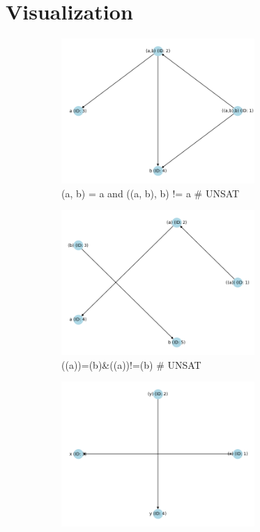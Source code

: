 \documentclass[11pt]{report}
\begin{document}
\newpage
\section*{Visualization}

\begin{figure}[h]

    \begin{subfigure}{0.5\textwidth}
        \includegraphics[width=0.9\linewidth, height=5.5cm]{graph/(a, b) = a and ((a, b), b) != a.png} 
        \caption*{(a, b) = a and ((a, b), b) != a \color{red}\# UNSAT }
        \label{fig:subim1}
        \end{subfigure}
    \begin{subfigure}{0.5\textwidth}
        \includegraphics[width=0.9\linewidth, height=5.5cm]{graph/((a))=(b)&((a))!=(b).png} 
        \caption*{((a))=(b)\&((a))!=(b) \color{red}\# UNSAT}
        \label{fig:subim2}
        \end{subfigure}
    \begin{subfigure}{0.5\textwidth}
        \includegraphics[width=0.9\linewidth, height=5.5cm]{graph/(x) = (y) and x != y.png}

\end{subfigure}
\end{figure}
\end{document}
